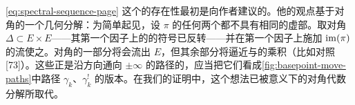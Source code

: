 \begin{remark}\label{thm:donaldson-diagonal-decomposition}
\eqref{eq:spectral-sequence-page} 这个\trSpectralSequence{}的存在性最初是\trDonaldson{}向作者建议的。他的观点基于对角的一个几何分解：为简单起见，设 $\pi$ 的任何两个\trCriticalValue{}都不具有相同的虚部。取对角 $\Delta\subset E\times E$——其第一个因子上的\trSymplecticForm{}的符号已反转——并在第一个因子上施加 $\operatorname{im}(\pi)$ 的\trHamilton{}流使之\trDeformation。对角的一部分将会流出 $E$，但其余部分将逼近\trStableManifold{}与\trUnstableManifold{}的乘积（比如对照 [73]）。这些\trManifold{}正是沿\trHorizontal{}方向通向 $\pm\infty$ 的路径的\trLefschetzThimble，应当把它们看成\cref{fig:basepoint-move-paths}中路径 $\gamma_k$、$\gamma^{!}_k$ 的\trDeformation{}版本。在我们的证明中，这个想法已被\trBeilinson{}意义下的对角代数分解所取代。
\end{remark}
